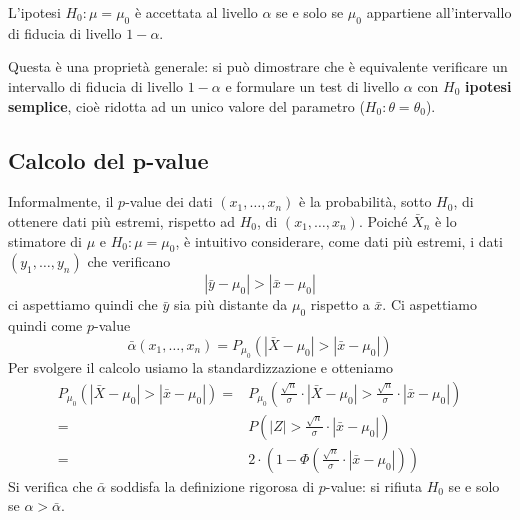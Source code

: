\begin{observation}
	L'ipotesi $H_0: \mu = \mu_0$ è accettata al livello $\alpha$ se e solo se $\mu_0$ appartiene
	all'intervallo di fiducia di livello $1-\alpha$.
\end{observation}

Questa è una proprietà generale: si può dimostrare che è equivalente verificare un intervallo di
fiducia di livello $1-\alpha$ e formulare un test di livello $\alpha$ con $H_0$
\textbf{ipotesi semplice}, cioè ridotta ad un unico valore del parametro
($H_0 : \theta = \theta_0$).

\subsection{Calcolo del p-value}
Informalmente, il $p$-value dei dati $(x_1, \dots, x_n)$ è la probabilità, sotto $H_0$, di
ottenere dati più estremi, rispetto ad $H_0$, di $(x_1, \dots, x_n)$. Poiché $\bar{X}_n$ è
lo stimatore di $\mu$ e $H_0: \mu = \mu_0$, è intuitivo considerare, come dati più estremi, i dati
$(y_1, \dots, y_n)$ che verificano
\[ |\bar{y} - \mu_0| > |\bar{x} - \mu_0| \]
ci aspettiamo quindi che $\bar{y}$ sia più distante da $\mu_0$ rispetto a $\bar{x}$. Ci
aspettiamo quindi come $p$-value
\[
	\bar{\alpha} (x_1, \dots, x_n) =
	P_{\mu_0} (|\bar{X} - \mu_0| > |\bar{x} - \mu_0|)
\]
Per svolgere il calcolo usiamo la standardizzazione e otteniamo
\begin{align*}
	P_{\mu_0} (|\bar{X} - \mu_0| > |\bar{x} - \mu_0|)
	= & P_{\mu_0} \left( \frac{\sqrt{n}}{\sigma} \cdot |\bar{X} - \mu_0| >
	\frac{\sqrt{n}}{\sigma} \cdot |\bar{x} - \mu_0| \right)                    \\
	= & P \left( |Z| > \frac{\sqrt{n}}{\sigma} \cdot |\bar{x} - \mu_0| \right) \\
	= & 2 \cdot \left(1 - \Phi \left(\frac{\sqrt{n}}{\sigma} \cdot
		|\bar{x} - \mu_0| \right) \right)
\end{align*}
Si verifica che $\bar{\alpha}$ soddisfa la definizione rigorosa di $p$-value: si rifiuta $H_0$
se e solo se $\alpha > \bar{\alpha}$.

